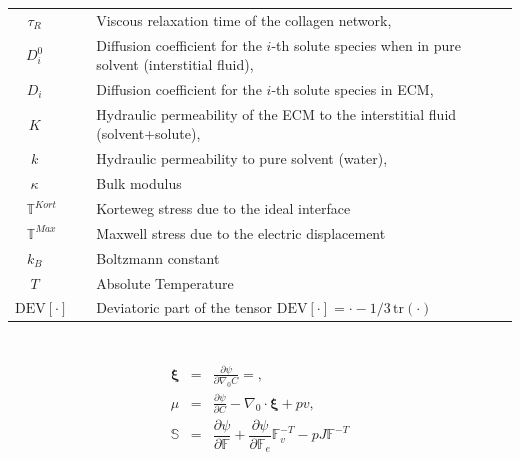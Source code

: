 \documentclass[runningheads]{llncs}
\newcommand{\F}{\ensuremath{\mathbb{F}}}
\begin{document}
\begin{table}[h!]
\begin{tabular}{c  l}
	$\tau_R\qquad$ & Viscous relaxation time of the collagen network,\\
	$D^0_i\qquad$ & Diffusion coefficient for the $i$-th solute species when in pure solvent (interstitial fluid),\\
	$D_i\qquad$ & Diffusion coefficient for the $i$-th solute species in ECM,\\
	$K\qquad$ &  Hydraulic permeability of the ECM to the interstitial fluid (solvent+solute),\\
	$k\qquad$ &  Hydraulic  permeability  to  pure  solvent (water),\\
	$\kappa\qquad$ & Bulk modulus\\
	$\mathbb{T}^{Kort}\quad$ & Korteweg stress due to the ideal interface\\
	$\mathbb{T}^{Max}\quad$ & Maxwell stress due to the electric displacement\\
	$k_B\qquad$ & Boltzmann constant\\
	$T\qquad$ & Absolute Temperature \\
	$\text{DEV}\left[\cdot\right]\quad$ & Deviatoric part of the tensor $\text{DEV}\left[\cdot\right] = \cdot-1/3\, \text{tr}(\cdot)$
\end{tabular}	
\end{table}
\section{}
\label{stateequation}
\begin{eqnarray}
\boldsymbol{\xi}&=&\frac{\partial \psi}{\partial \nabla_0 C}=,\\[2mm]
\mu &=& \frac{\partial \psi}{\partial C} - \nabla_0\cdot\boldsymbol{\xi}+ p v,\\[2mm]
\mathbb{S} &=&  \dfrac{\partial \psi}{\partial \F} + \dfrac{\partial \psi}{\partial \F_e}\F_v^{-T}- p J \F^{-T}
\end{eqnarray}
\end{document}
